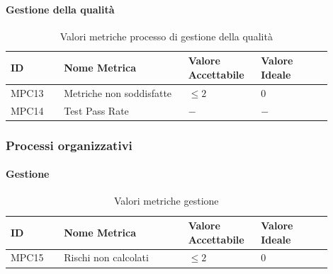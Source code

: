 \documentclass[a4paper,12pt]{article}
\begin{document}
                \paragraph{Gestione della qualità} \mbox{}
                    \begin{longtable}{|M{0.15\linewidth}|M{0.35\linewidth}|M{0.2\linewidth}|M{0.2\linewidth}|}

                        \caption{Valori metriche processo di gestione della qualità} \\
                        \hline
                        \textbf{ID} & \textbf{Nome Metrica} & \textbf{Valore Accettabile} & \textbf{Valore Ideale} \\
                        \hline
                        \endhead

                        MPC13 & Metriche non soddisfatte & $\le 2$ & $0$ \\
                        \hline

                        MPC14 & Test Pass Rate & $-$ & $-$ \\
                        \hline

                    \end{longtable}


            \subsubsection{Processi organizzativi}
                \paragraph{Gestione} \mbox{}
                    \begin{longtable}{|M{0.15\linewidth}|M{0.35\linewidth}|M{0.2\linewidth}|M{0.2\linewidth}|}

                        \caption{Valori metriche gestione} \\
                        \hline
                        \textbf{ID} & \textbf{Nome Metrica} & \textbf{Valore Accettabile} & \textbf{Valore Ideale} \\
                        \hline
                        \endhead

                        MPC15 & Rischi non calcolati & $\le 2$ & $0$ \\
                        \hline

                    \end{longtable}
\end{document}
